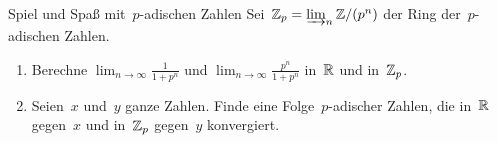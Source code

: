\documentclass[entwurf]{uebblatt}
\begin{document}

\begin{aufgabe}{}{Spiel und Spaß mit~$p$-adischen Zahlen}
Sei~$\mathbb{Z}_p = \varinjlim_n \mathbb{Z}/(p^n)$ der Ring der~$p$-adischen Zahlen.
\begin{enumerate}
\item Berechne $\lim_{n \to \infty} \frac{1}{1 + p^n}$ und $\lim_{n \to \infty}
\frac{p^n}{1 + p^n}$ in~$\mathbb{R}$ und in~$\mathbb{Z}_p$.
\item Seien~$x$ und~$y$ ganze Zahlen. Finde eine Folge~$p$-adischer Zahlen, die
in~$\mathbb{R}$ gegen~$x$ und in~$\mathbb{Z}_p$ gegen~$y$ konvergiert.
\end{enumerate}
\end{aufgabe}
\end{document}
